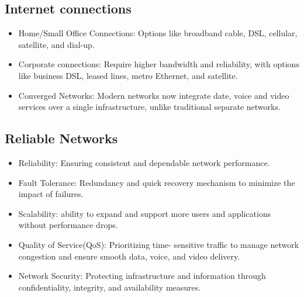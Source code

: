 \documentclass[a4paper,11pt]{article}
\begin{document}
\subsection{Internet connections}
\begin{itemize}
    \item Home/Small Office Connections: Options like broadband cable, DSL, cellular, satellite, and dial-up.\\
    \item Corporate connections: Require higher bandwidth and reliability, with options like business DSL, leased lines, metro Ethernet, and satellite.\\
    \item Converged Networks: Modern networks now integrate date, voice and video services over a single infrastructure, unlike traditional separate networks.\\
\end{itemize}

\subsection{Reliable Networks}
\begin{itemize}
    \item Reliability: Ensuring consistent and dependable network performance.\\
    \item Fault Tolerance: Redundancy and quick recovery mechanism to minimize the impact of failures.\\
    \item Scalability: ability to expand and support more users and applications without performance drops.\\
    \item Quality of Service(QoS): Prioritizing time- sensitive traffic to manage network congestion and ensure smooth data, voice, and video delivery.\\
    \item Network Security: Protecting infrastructure and information through confidentiality, integrity, and availability measures.\\
\end{itemize}
\end{document}
